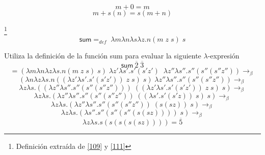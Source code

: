            \[ m + 0 = m \]
           \[ m + s(n) = s(m + n) \]


        \begin{definition}\footnote{Definición extraída de \hyperlink{109}{[109]} y  \hyperlink{111}{[111]}}
            $$\textsf{sum} =_{def}  \; \lambda m\lambda n\lambda s\lambda z.n(m \; z \; s) \; s$$
        \end{definition}

        \begin{exercise}
            Utiliza la definición de la función \textsf{sum} para evaluar la siguiente  $\lambda$-expresión
            \[
                \textsf{sum}\  \overline{2} \; \overline{3} 
            \]
            \[
                = (\lambda m\lambda n\lambda z\lambda s.n(m \; z \; s) \; s) \; \lambda z'\lambda s'.s'(s'z') \;\; \lambda z''\lambda s''.s''(s''(s''z'')) \rightarrow_\beta 
            \]
            \[
                (\lambda n\lambda z\lambda s.n((\lambda z'\lambda s'.s'(s'z')) \; z \; s) \; s) \; \lambda z''\lambda s''.s''(s''(s''z'')) \rightarrow_\beta 
            \]
            \[
                \lambda z\lambda s.((\lambda z''\lambda s''.s''(s''(s''z''))) \; ((\lambda z'\lambda s'.s'(s'z')) \; z \; s) \; s) \rightarrow_\beta
            \]
            \[
                \lambda z\lambda s.(\lambda z''\lambda s''.s''(s''(s''z'')) \; ((\lambda s'.s'(s'z))  \; s) \; s) \rightarrow_\beta
            \]
            \[
                \lambda z\lambda s.(\lambda z''\lambda s''.s''(s''(s''z'')) \; (s(sz)) \; s) \rightarrow_\beta
            \]
            \[
                \lambda z\lambda s.(\lambda s''.s''(s''(s''(s(sz)))) \; s) \rightarrow_\beta
            \]
            \[
                \lambda z\lambda s.s(s(s(s(sz)))) = \overline{5}
            \]
        \end{exercise}

